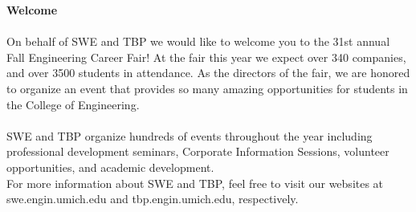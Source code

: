 \documentclass[twoside]{article}
\begin{document}
    
    \startforewardsection
    { \fontsize{16}{19}\selectfont \bf Welcome}\\~\\On behalf of SWE and TBP we would like to welcome you to the 31st annual Fall Engineering Career Fair! At the fair this year we expect over 340 companies, and over 3500 students in attendance. As the directors of the fair, we are honored to organize an event that provides so many amazing opportunities for students in the College of Engineering. ~\\

    ~\\

    SWE and TBP organize hundreds of events throughout the year including professional development seminars, Corporate Information Sessions, volunteer opportunities, and academic development. ~\\

    For more information about SWE and TBP, feel free to visit our websites at swe.engin.umich.edu and tbp.engin.umich.edu, respectively.~\\
\end{document}
